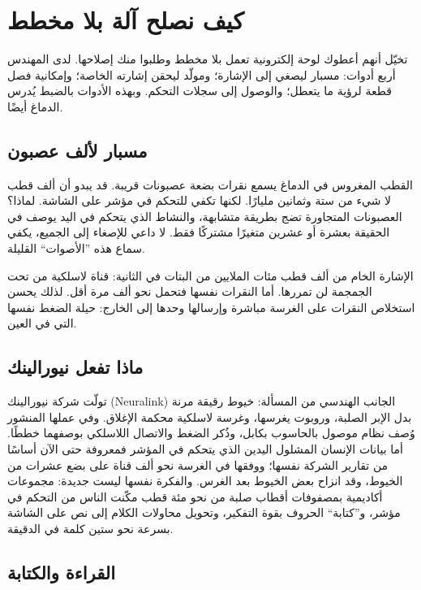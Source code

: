 \chapter{كيف نصلح آلة بلا مخطط}


تخيّل أنهم أعطوك لوحة إلكترونية تعمل بلا مخطط وطلبوا منك إصلاحها. لدى المهندس أربع أدوات: مسبار ليصغي إلى الإشارة؛ ومولّد ليحقن إشارته الخاصة؛ وإمكانية فصل قطعة لرؤية ما يتعطل؛ والوصول إلى سجلات التحكم. وبهذه الأدوات بالضبط يُدرس الدماغ أيضًا.

\section*{مسبار لألف عصبون}

القطب المغروس في الدماغ يسمع نقرات بضعة عصبونات قريبة. قد يبدو أن ألف قطب لا شيء من ستة وثمانين مليارًا. لكنها تكفي للتحكم في مؤشر على الشاشة. لماذا؟ العصبونات المتجاورة تضج بطريقة متشابهة، والنشاط الذي يتحكم في اليد يوصف في الحقيقة بعشرة أو عشرين متغيرًا مشتركًا فقط. لا داعي للإصغاء إلى الجميع، يكفي سماع هذه ”الأصوات“ القليلة.

الإشارة الخام من ألف قطب مئات الملايين من البتات في الثانية: قناة لاسلكية من تحت الجمجمة لن تمررها. أما النقرات نفسها فتحمل نحو ألف مرة أقل. لذلك يحسن استخلاص النقرات على الغرسة مباشرة وإرسالها وحدها إلى الخارج: حيلة الضغط نفسها التي في العين.

\section*{ماذا تفعل نيورالينك}

تولّت شركة نيورالينك (\foreignlanguage{english}{Neuralink}) الجانب الهندسي من المسألة: خيوط رقيقة مرنة بدل الإبر الصلبة، وروبوت يغرسها، وغرسة لاسلكية محكمة الإغلاق. وفي عملها المنشور وُصف نظام موصول بالحاسوب بكابل، وذُكر الضغط والاتصال اللاسلكي بوصفهما خططًا. أما بيانات الإنسان المشلول اليدين الذي يتحكم في المؤشر فمعروفة حتى الآن أساسًا من تقارير الشركة نفسها؛ ووفقها في الغرسة نحو ألف قناة على بضع عشرات من الخيوط، وقد انزاح بعض الخيوط بعد الغرس. والفكرة نفسها ليست جديدة: مجموعات أكاديمية بمصفوفات أقطاب صلبة من نحو مئة قطب مكّنت الناس من التحكم في مؤشر، و”كتابة“ الحروف بقوة التفكير، وتحويل محاولات الكلام إلى نص على الشاشة بسرعة نحو ستين كلمة في الدقيقة.

\section*{القراءة والكتابة}

